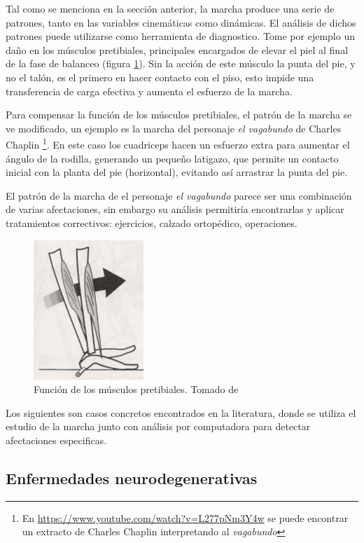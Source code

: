 Tal como se menciona en la sección anterior, la marcha produce una serie de patrones, tanto en las variables cinemáticas como dinámicas. El análisis de dichos patrones puede utilizarse como herramienta de diagnostico. Tome por ejemplo un daño en los músculos pretibiales, principales encargados de elevar el piel al final de la fase de balanceo (figura \ref{fig:heel_rocker}). Sin la acción de este músculo la punta del pie, y no el talón, es el primero en hacer contacto con el piso, esto impide una transferencia de carga efectiva y aumenta el esfuerzo de la marcha.

Para compensar la función de los músculos pretibiales, el patrón de la marcha se ve modificado, un ejemplo es la marcha del personaje \emph{el vagabundo} de Charles Chaplin \footnote{En \url{https://www.youtube.com/watch?v=L277pNm3Y4w} se puede encontrar un extracto de Charles Chaplin interpretando al \emph{vagabundo}}. En este caso los cuadriceps hacen un esfuerzo extra para aumentar el ángulo de la rodilla, generando un pequeño latigazo, que permite un contacto inicial con la planta del pie (horizontal), evitando así arrastrar la punta del pie.

El patrón de la marcha de el personaje \emph{el vagabundo} parece ser una combinación de varias afectaciones, sin embargo su análisis permitiría encontrarlas y aplicar tratamientos correctivos: ejercicios, calzado ortopédico, operaciones. 

\begin{figure}
    \centering
    \includegraphics[width=0.2\textheight]{imagenes/heel_rocker}
    \caption{Función de los músculos pretibiales. Tomado de \citep{perry}}
    \label{fig:heel_rocker}
\end{figure}

Los siguientes son casos concretos encontrados en la literatura, donde se utiliza el estudio de la marcha junto con análisis por computadora para detectar afectaciones especificas.

\subsection{Enfermedades neurodegenerativas}

